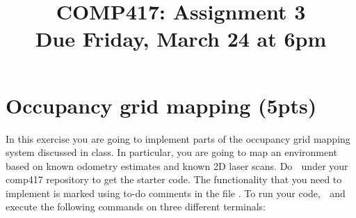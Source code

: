 \documentclass[a4paper,10pt]{article}
\title{COMP417: Assignment 3\\Due Friday, March 24  at 6pm}
\author{}
\begin{document}
\maketitle


\section{Occupancy grid mapping (5pts)}
In this exercise you are going to implement parts of the occupancy grid mapping system discussed in class. In particular, you are going to map an environment 
based on known odometry estimates and known 2D laser scans. Do  $\;$  under your comp417 repository to get the starter code. The functionality 
that you need to implement is marked using to-do comments in the file . To run your code, 
 $\;$  and execute the following commands on three different terminals: 
\newline

   $\;$  $\;$ 
  
   $\;$  $\;$  $\;$  $\;$ 
  
\end{document}
